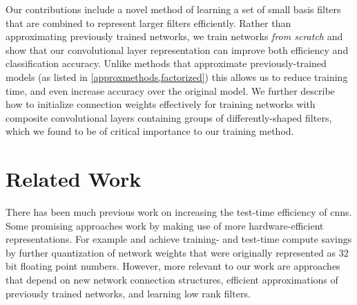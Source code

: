 \documentclass[thesis]{subfiles}
\begin{document}
    
    Our contributions include a novel method of learning a set of small basis filters that are combined to represent larger filters efficiently. Rather than approximating previously trained networks, we train networks \emph{from scratch} and show that our convolutional layer representation can improve both efficiency and classification accuracy. Unlike methods that approximate previously-trained models (as listed in \cref{approxmethods,factorized}) this allows us to reduce training time, and even increase accuracy over the original model. We further describe how to initialize connection weights effectively for training networks with composite convolutional layers containing groups of differently-shaped filters, which we found to be of critical importance to our training method.
    
    \section{Related Work}
    \label{relatedwork}
    There has been much previous work on increasing the test-time efficiency of \glspl{cnn}. Some promising approaches work by making use of more hardware-efficient representations. For example \citet{1502.02551v1} and \citet{vanhoucke2011improving} achieve training- and test-time compute savings by further quantization of network weights that were originally represented as 32 bit floating point numbers. However, more relevant to our work are approaches that depend on new network connection structures, efficient approximations of previously trained networks, and learning low rank filters. 
    
\end{document}
